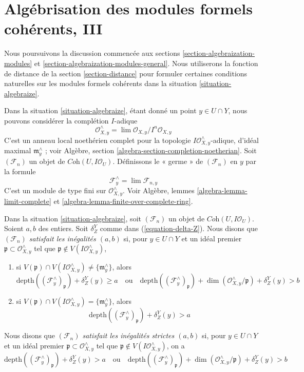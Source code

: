 \section{Algébrisation des modules formels cohérents, III}
\label{section-uniqueness}

\noindent
Nous poursuivons la discussion commencée aux sections
\ref{section-algebraization-modules} et
\ref{section-algebraization-modules-general}.
Nous utiliserons la fonction de distance de la section \ref{section-distance}
pour formuler certaines conditions naturelles sur les
modules formels cohérents dans la situation \ref{situation-algebraize}.

\medskip\noindent
Dans la situation \ref{situation-algebraize}, étant donné un point $y \in U \cap Y$,
nous pouvons considérer la complétion $I$-adique
$$
\mathcal{O}_{X, y}^\wedge = \lim \mathcal{O}_{X, y}/I^n\mathcal{O}_{X, y}
$$
C'est un anneau local noethérien complet pour la topologie
$I\mathcal{O}_{X, y}^\wedge$-adique, d'idéal maximal $\mathfrak m_y^\wedge$ ; voir
Algèbre, section \ref{algebra-section-completion-noetherian}.
Soit $(\mathcal{F}_n)$ un objet de $\textit{Coh}(U, I\mathcal{O}_U)$.
Définissons le « germe » de $(\mathcal{F}_n)$ en $y$ par la formule
$$
\mathcal{F}_y^\wedge = \lim \mathcal{F}_{n, y}
$$
C'est un module de type fini sur $\mathcal{O}_{X, y}^\wedge$. Voir
Algèbre, lemmes \ref{algebra-lemma-limit-complete} et
\ref{algebra-lemma-finite-over-complete-ring}.

\begin{definition}
\label{definition-s-d-inequalities}
Dans la situation \ref{situation-algebraize}, soit $(\mathcal{F}_n)$ un objet
de $\textit{Coh}(U, I\mathcal{O}_U)$. Soient $a, b$ des entiers.
Soit $\delta^Y_Z$ comme dans (\ref{equation-delta-Z}).
Nous disons que
{\it $(\mathcal{F}_n)$ satisfait les inégalités $(a, b)$} si, pour
$y \in U \cap Y$ et un idéal premier $\mathfrak p \subset \mathcal{O}_{X, y}^\wedge$
tel que $\mathfrak p \not \in V(I\mathcal{O}_{X, y}^\wedge)$,
\begin{enumerate}
\item si $V(\mathfrak p) \cap V(I\mathcal{O}_{X, y}^\wedge) \not =
\{\mathfrak m_y^\wedge\}$, alors
$$
\text{depth}((\mathcal{F}^\wedge_y)_\mathfrak p) + \delta^Y_Z(y) \geq a
\quad\text{ou}\quad
\text{depth}((\mathcal{F}^\wedge_y)_\mathfrak p) +
\dim(\mathcal{O}_{X, y}^\wedge/\mathfrak p) + \delta^Y_Z(y) > b
$$
\item si $V(\mathfrak p) \cap V(I\mathcal{O}_{X, y}^\wedge) =
\{\mathfrak m_y^\wedge\}$, alors
$$
\text{depth}((\mathcal{F}^\wedge_y)_\mathfrak p) + \delta^Y_Z(y) > a
$$
\end{enumerate}
Nous disons que {\it $(\mathcal{F}_n)$ satisfait les inégalités strictes $(a, b)$}
si, pour $y \in U \cap Y$ et un idéal premier
$\mathfrak p \subset \mathcal{O}_{X, y}^\wedge$ tel que
$\mathfrak p \not \in V(I\mathcal{O}_{X, y}^\wedge)$,
on a
$$
\text{depth}((\mathcal{F}^\wedge_y)_\mathfrak p) + \delta^Y_Z(y) > a
\quad\text{ou}\quad
\text{depth}((\mathcal{F}^\wedge_y)_\mathfrak p) +
\dim(\mathcal{O}_{X, y}^\wedge/\mathfrak p) + \delta^Y_Z(y) > b
$$
\end{definition}

